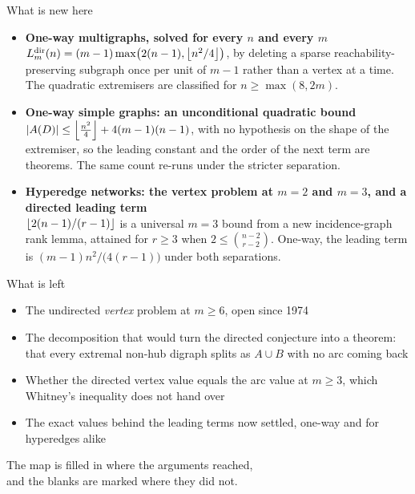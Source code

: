 \documentclass[aspectratio=1610,11pt]{beamer}
\begin{document}
\begin{frame}{What is new here}
\vfill
\begin{itemize}\setlength{\itemsep}{13pt}
  \item[\color{KULblauw1}\textbf{1}] \textbf{One-way multigraphs, solved for every $n$ and every $m$}\\
        {\small\color{black!60} $L_m^{\mathrm{dir}}(n)=(m-1)\max\bigl(2(n-1),\left\lfloor n^2/4\right\rfloor\bigr)$, by deleting a sparse reachability-preserving subgraph once per unit of $m-1$ rather than a vertex at a time. The quadratic extremisers are classified for $n\ge\max(8,2m)$.}
  \item[\color{KULblauw1}\textbf{2}] \textbf{One-way simple graphs: an unconditional quadratic bound}\\
        {\small\color{black!60} $|A(D)|\le\left\lfloor \frac{n^2}{4}\right\rfloor+4(m-1)(n-1)$, with no hypothesis on the shape of the extremiser, so the leading constant and the order of the next term are theorems. The same count re-runs under the stricter separation.}
  \item[\color{KULblauw1}\textbf{3}] \textbf{Hyperedge networks: the vertex problem at $m=2$ and $m=3$, and a directed leading term}\\
        {\small\color{black!60} $\left\lfloor 2(n-1)/(r-1)\right\rfloor$ is a universal $m=3$ bound from a new incidence-graph rank lemma, attained for $r\ge3$ when $2\le\binom{n-2}{r-2}$. One-way, the leading term is $(m-1)n^2/\bigl(4(r-1)\bigr)$ under both separations.}
\end{itemize}
\vfill
\end{frame}

\begin{frame}{What is left}
\vfill
\begin{itemize}\setlength{\itemsep}{12pt}
  \item[{\color{stPartial}$\blacksquare$}] The undirected \emph{vertex} problem at $m\ge6$, open since 1974
  \item[{\color{stConj}$\blacksquare$}] The decomposition that would turn the directed conjecture into a theorem: that every extremal non-hub digraph splits as $A\cup B$ with no arc coming back
  \item[{\color{stConj}$\blacksquare$}] Whether the directed vertex value equals the arc value at $m\ge3$, which Whitney's inequality does not hand over
  \item[{\color{stOpen}$\blacksquare$}] The exact values behind the leading terms now settled, one-way and for hyperedges alike
\end{itemize}

\vspace{22pt}
\centering
{\color{black!55}\small The map is filled in where the arguments reached,}\\[3pt]
{\color{black!55}\small and the blanks are marked where they did not.}
\vfill
\end{frame}
\end{document}
